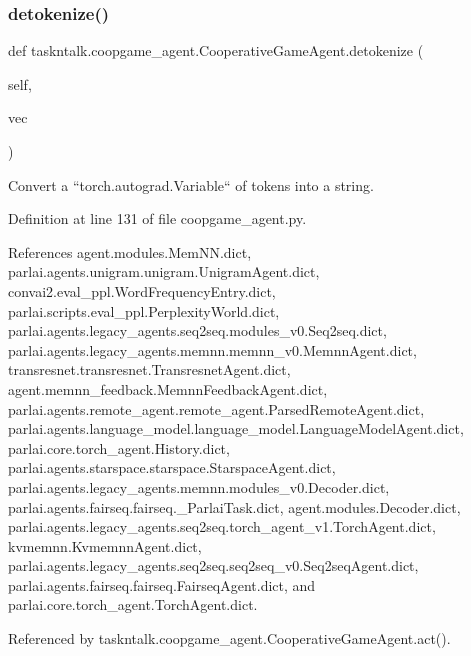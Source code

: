 \subsubsection{\texorpdfstring{detokenize()}{detokenize()}}
{\footnotesize\ttfamily def taskntalk.\+coopgame\+\_\+agent.\+Cooperative\+Game\+Agent.\+detokenize (\begin{DoxyParamCaption}\item[{}]{self,  }\item[{}]{vec }\end{DoxyParamCaption})}

\begin{DoxyVerb}Convert a ``torch.autograd.Variable`` of tokens into a string.\end{DoxyVerb}
 

Definition at line 131 of file coopgame\+\_\+agent.\+py.



References agent.\+modules.\+Mem\+N\+N.\+dict, parlai.\+agents.\+unigram.\+unigram.\+Unigram\+Agent.\+dict, convai2.\+eval\+\_\+ppl.\+Word\+Frequency\+Entry.\+dict, parlai.\+scripts.\+eval\+\_\+ppl.\+Perplexity\+World.\+dict, parlai.\+agents.\+legacy\+\_\+agents.\+seq2seq.\+modules\+\_\+v0.\+Seq2seq.\+dict, parlai.\+agents.\+legacy\+\_\+agents.\+memnn.\+memnn\+\_\+v0.\+Memnn\+Agent.\+dict, transresnet.\+transresnet.\+Transresnet\+Agent.\+dict, agent.\+memnn\+\_\+feedback.\+Memnn\+Feedback\+Agent.\+dict, parlai.\+agents.\+remote\+\_\+agent.\+remote\+\_\+agent.\+Parsed\+Remote\+Agent.\+dict, parlai.\+agents.\+language\+\_\+model.\+language\+\_\+model.\+Language\+Model\+Agent.\+dict, parlai.\+core.\+torch\+\_\+agent.\+History.\+dict, parlai.\+agents.\+starspace.\+starspace.\+Starspace\+Agent.\+dict, parlai.\+agents.\+legacy\+\_\+agents.\+memnn.\+modules\+\_\+v0.\+Decoder.\+dict, parlai.\+agents.\+fairseq.\+fairseq.\+\_\+\+Parlai\+Task.\+dict, agent.\+modules.\+Decoder.\+dict, parlai.\+agents.\+legacy\+\_\+agents.\+seq2seq.\+torch\+\_\+agent\+\_\+v1.\+Torch\+Agent.\+dict, kvmemnn.\+Kvmemnn\+Agent.\+dict, parlai.\+agents.\+legacy\+\_\+agents.\+seq2seq.\+seq2seq\+\_\+v0.\+Seq2seq\+Agent.\+dict, parlai.\+agents.\+fairseq.\+fairseq.\+Fairseq\+Agent.\+dict, and parlai.\+core.\+torch\+\_\+agent.\+Torch\+Agent.\+dict.



Referenced by taskntalk.\+coopgame\+\_\+agent.\+Cooperative\+Game\+Agent.\+act().


